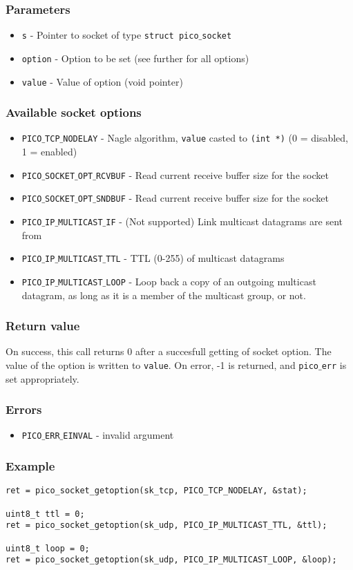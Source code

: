 \subsubsection*{Parameters}
\begin{itemize}[noitemsep]
\item \texttt{s} - Pointer to socket of type \texttt{struct pico$\_$socket}
\item \texttt{option} - Option to be set (see further for all options)
\item \texttt{value} - Value of option (void pointer)
\end{itemize}

\subsubsection*{Available socket options}
\begin{itemize}[noitemsep]
\item \texttt{PICO$\_$TCP$\_$NODELAY} - Nagle algorithm, \texttt{value} casted to \texttt{(int *)} (0 = disabled, 1 = enabled)
\item \texttt{PICO$\_$SOCKET$\_$OPT$\_$RCVBUF} - Read current receive buffer size for the socket
\item \texttt{PICO$\_$SOCKET$\_$OPT$\_$SNDBUF} - Read current receive buffer size for the socket
\item \texttt{PICO$\_$IP$\_$MULTICAST$\_$IF} - (Not supported) Link multicast datagrams are sent from
\item \texttt{PICO$\_$IP$\_$MULTICAST$\_$TTL} - TTL (0-255) of multicast datagrams
\item \texttt{PICO$\_$IP$\_$MULTICAST$\_$LOOP} - Loop back a copy of an outgoing multicast datagram, as long as it is a member of the multicast group, or not.
\end{itemize}

\subsubsection*{Return value}
On success, this call returns 0 after a succesfull getting of socket option. The value of
the option is written to \texttt{value}.
On error, -1 is returned, and \texttt{pico$\_$err} is set appropriately.

\subsubsection*{Errors}
\begin{itemize}[noitemsep]
\item \texttt{PICO$\_$ERR$\_$EINVAL} - invalid argument
\end{itemize}

\subsubsection*{Example}
\begin{verbatim}
ret = pico_socket_getoption(sk_tcp, PICO_TCP_NODELAY, &stat);

uint8_t ttl = 0;
ret = pico_socket_getoption(sk_udp, PICO_IP_MULTICAST_TTL, &ttl);

uint8_t loop = 0;
ret = pico_socket_getoption(sk_udp, PICO_IP_MULTICAST_LOOP, &loop);
\end{verbatim}
